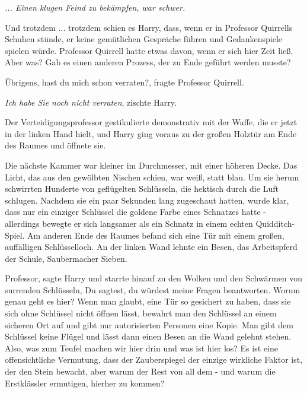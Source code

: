 \emph{... Einen klugen Feind zu bekämpfen, war schwer.}

Und trotzdem ... trotzdem schien es Harry, dass, wenn er in Professor Quirrells
Schuhen stünde, er keine gemütlichen Gespräche führen und Gedankenspiele spielen
würde. Professor Quirrell hatte etwas davon, wenn er sich hier Zeit ließ. Aber
was? Gab es einen anderen Prozess, der zu Ende geführt werden musste?

\glqq{}Übrigens, hast du mich schon verraten?\grqq{}, fragte Professor Quirrell.

\glqq{}\emph{Ich habe Sie noch nicht verraten}\grqq{}, zischte Harry.

Der Verteidigungsprofessor gestikulierte demonstrativ mit der Waffe, die er
jetzt in der linken Hand hielt, und Harry ging voraus zu der großen Holztür am
Ende des Raumes und öffnete sie.

Die nächste Kammer war kleiner im Durchmesser, mit einer höheren Decke. Das
Licht, das aus den gewölbten Nischen schien, war weiß, statt blau. Um sie herum
schwirrten Hunderte von geflügelten Schlüsseln, die hektisch durch die Luft
schlugen. Nachdem sie ein paar Sekunden lang zugeschaut hatten, wurde klar, dass
nur ein einziger Schlüssel die goldene Farbe eines Schnatzes hatte - allerdings
bewegte er sich langsamer als ein Schnatz in einem echten Quidditch-Spiel. Am
anderen Ende des Raumes befand sich eine Tür mit einem großen, auffälligen
Schlüsselloch. An der linken Wand lehnte ein Besen, das Arbeitspferd der Schule,
Saubermacher Sieben.

\glqq{}Professor\grqq{}, sagte Harry und starrte hinauf zu den Wolken und den
Schwärmen von surrenden Schlüsseln, \glqq{}Du sagtest, du würdest meine Fragen
beantworten. Worum genau geht es hier? Wenn man glaubt, eine Tür so gesichert zu
haben, dass sie sich ohne Schlüssel nicht öffnen lässt, bewahrt man den
Schlüssel an einem sicheren Ort auf und gibt nur autorisierten Personen eine
Kopie. Man gibt dem Schlüssel keine Flügel und lässt dann einen Besen an die
Wand gelehnt stehen. Also, was zum Teufel machen wir hier drin und was ist hier
los? Es ist eine offensichtliche Vermutung, dass der Zauberspiegel der einzige
wirkliche Faktor ist, der den Stein bewacht, aber warum der Rest von all dem -
und warum die Erstklässler ermutigen, hierher zu kommen?\grqq{}

